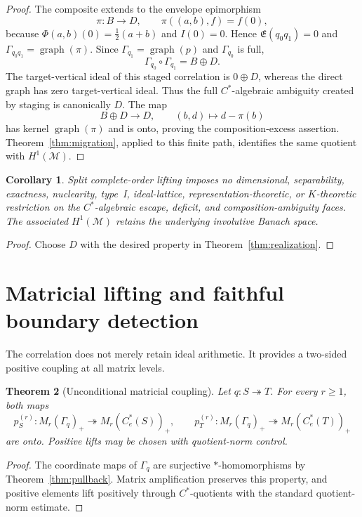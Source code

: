 \documentclass[11pt,a4paper]{amsart}
\theoremstyle{plain}
\newtheorem{theorem}{Theorem}[section]
\newtheorem{corollary}[theorem]{Corollary}
\theoremstyle{definition}
\newcommand{\Ce}{C_e^*}
\newcommand{\Esc}{\mathfrak E}
\newcommand{\graph}{\operatorname{graph}}
\begin{document}
\begin{proof}
The composite extends to the envelope epimorphism
\[
 \pi:B\longrightarrow D,\qquad
 \pi((a,b),f)=f(0),
\]
because $\Phi(a,b)(0)=\tfrac12(a+b)$ and $I(0)=0$.  Hence
$\Esc(q_0q_1)=0$ and $\Gamma_{q_0q_1}=\graph(\pi)$.  Since
$\Gamma_{q_1}=\graph(p)$ and $\Gamma_{q_0}$ is full,
\[
\Gamma_{q_0}\circ\Gamma_{q_1}=B\oplus D.
\]
The target-vertical ideal of this staged correlation is \(0\oplus D\), whereas the direct graph
has zero target-vertical ideal.  Thus the full \(C^*\)-algebraic ambiguity created by staging is
canonically \(D\).
The map
\[
 B\oplus D\longrightarrow D,\qquad (b,d)\longmapsto d-\pi(b)
\]
has kernel $\graph(\pi)$ and is onto, proving the composition-excess assertion.
Theorem~\ref{thm:migration}, applied to this finite path, identifies the same quotient with
$H^1(\mathcal M)$.
\end{proof}

\begin{corollary}\label{cor:no-bounds}
Split complete-order lifting imposes no dimensional, separability, exactness, nuclearity,
type~I, ideal-lattice, representation-theoretic, or $K$-theoretic restriction on the
$C^*$-algebraic escape, deficit, and composition-ambiguity faces.  The associated
$H^1(\mathcal M)$ retains the underlying involutive Banach space.
\end{corollary}

\begin{proof}
Choose $D$ with the desired property in Theorem~\ref{thm:realization}.
\end{proof}

\section{Matricial lifting and faithful boundary detection}\label{sec:detection}

The correlation does not merely retain ideal arithmetic.  It provides a two-sided positive
coupling at all matrix levels.

\begin{theorem}[Unconditional matricial coupling]\label{thm:matrix}
Let $q:S\twoheadrightarrow T$.  For every $r\geq1$, both maps
\[
 p_S^{(r)}:M_r(\Gamma_q)_+\twoheadrightarrow M_r(\Ce(S))_+,\qquad
 p_T^{(r)}:M_r(\Gamma_q)_+\twoheadrightarrow M_r(\Ce(T))_+
\]
are onto.  Positive lifts may be chosen with quotient-norm control.
\end{theorem}

\begin{proof}
The coordinate maps of $\Gamma_q$ are surjective $*$-homomorphisms by
Theorem~\ref{thm:pullback}.  Matrix amplification preserves this property, and positive elements
lift positively through $C^*$-quotients with the standard quotient-norm estimate.
\end{proof}
\end{document}
